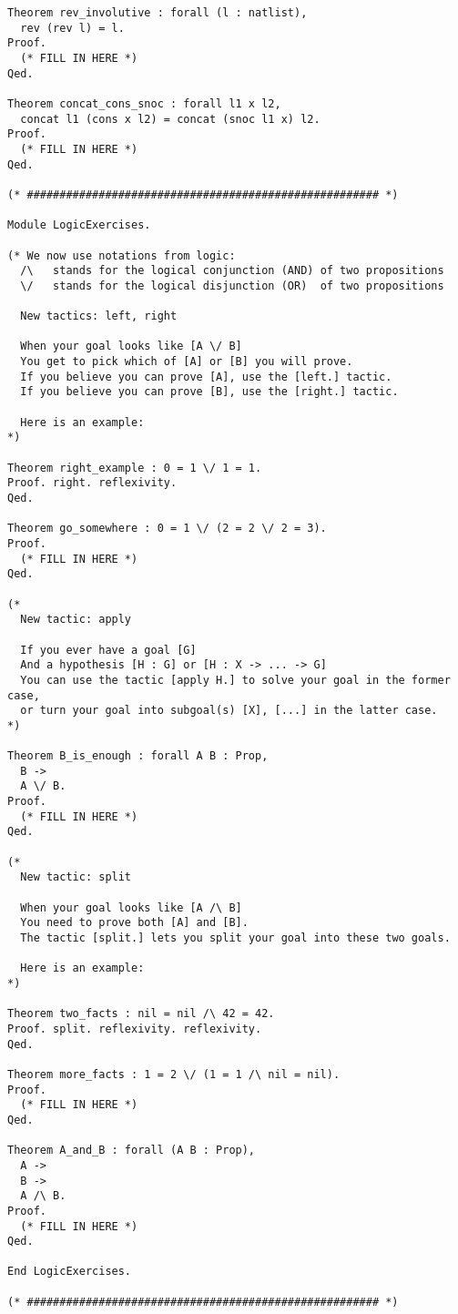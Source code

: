 \begin{verbatim}
Theorem rev_involutive : forall (l : natlist),
  rev (rev l) = l.
Proof.
  (* FILL IN HERE *)
Qed.

Theorem concat_cons_snoc : forall l1 x l2,
  concat l1 (cons x l2) = concat (snoc l1 x) l2.
Proof.
  (* FILL IN HERE *)
Qed.

(* ###################################################### *)

Module LogicExercises.

(* We now use notations from logic:
  /\   stands for the logical conjunction (AND) of two propositions
  \/   stands for the logical disjunction (OR)  of two propositions

  New tactics: left, right

  When your goal looks like [A \/ B]
  You get to pick which of [A] or [B] you will prove.
  If you believe you can prove [A], use the [left.] tactic.
  If you believe you can prove [B], use the [right.] tactic.

  Here is an example:
*)

Theorem right_example : 0 = 1 \/ 1 = 1.
Proof. right. reflexivity.
Qed.

Theorem go_somewhere : 0 = 1 \/ (2 = 2 \/ 2 = 3).
Proof.
  (* FILL IN HERE *)
Qed.

(*
  New tactic: apply

  If you ever have a goal [G]
  And a hypothesis [H : G] or [H : X -> ... -> G]
  You can use the tactic [apply H.] to solve your goal in the former case,
  or turn your goal into subgoal(s) [X], [...] in the latter case.
*)

Theorem B_is_enough : forall A B : Prop,
  B ->
  A \/ B.
Proof.
  (* FILL IN HERE *)
Qed.

(*
  New tactic: split

  When your goal looks like [A /\ B]
  You need to prove both [A] and [B].
  The tactic [split.] lets you split your goal into these two goals.

  Here is an example:
*)

Theorem two_facts : nil = nil /\ 42 = 42.
Proof. split. reflexivity. reflexivity.
Qed.

Theorem more_facts : 1 = 2 \/ (1 = 1 /\ nil = nil).
Proof.
  (* FILL IN HERE *)
Qed.

Theorem A_and_B : forall (A B : Prop),
  A ->
  B ->
  A /\ B.
Proof.
  (* FILL IN HERE *)
Qed.

End LogicExercises.

(* ###################################################### *)


\end{verbatim}
